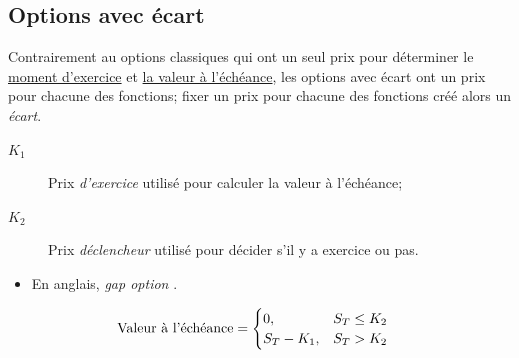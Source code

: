 \documentclass[10pt, french]{article}
\begin{document}
\begin{multicols*}{2}
\columnbreak
\subsection{Options avec écart}
\begin{definitionNOHFILL}
Contrairement au options classiques qui ont un seul prix pour déterminer le \underline{moment d'exercice} et \underline{la valeur à l'échéance}, les options avec écart ont un prix pour chacune des fonctions; fixer un prix pour chacune des fonctions créé alors un \textit{écart}.

\begin{distributions}[Notation]
\begin{description}
	\item[$K_{1}$]	Prix \textit{d'exercice} utilisé pour calculer la valeur à l'échéance;
	\item[$K_{2}$]	Prix \textit{déclencheur} utilisé pour décider s'il y a exercice ou pas.
\end{description}
\end{distributions}

\tcbline

\begin{itemize}[leftmargin = *]
	\item	En anglais, \og \textit{gap option} \fg{}.
\end{itemize}
\end{definitionNOHFILL}

\begin{definitionNOHFILLsub}
\begin{align*}
	\shortstack{Valeur à l'échéance}
	&=	\begin{cases}
		0,	&	S_{T}	\leq		K_{2}	\\
		S_{T}	-	K_{1},	&	S_{T}	>		K_{2}	\\
		\end{cases}
\end{align*}

\begin{center}	

\end{center}
\end{definitionNOHFILLsub}
\end{multicols*}
\end{document}
